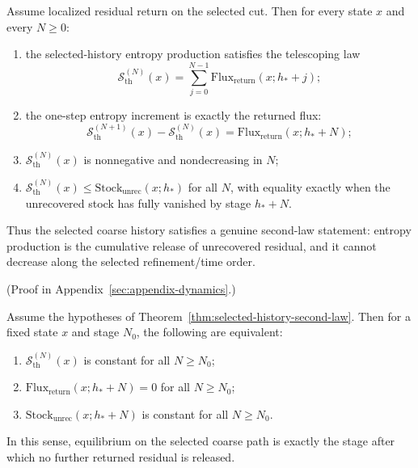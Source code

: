 \begin{theorem}
\label{thm:selected-history-second-law}
Assume localized residual return on the selected cut. Then for every state
\(x\) and every \(N\ge 0\):
\begin{enumerate}[label=(\roman*), leftmargin=2em, itemsep=0.2em]
\item the selected-history entropy production satisfies the telescoping law
      \[
      \mathcal S_{\mathrm{th}}^{(N)}(x)
      =
      \sum_{j=0}^{N-1}\mathrm{Flux}_{\mathrm{return}}(x;h_\ast+j);
      \]
\item the one-step entropy increment is exactly the returned flux:
      \[
      \mathcal S_{\mathrm{th}}^{(N+1)}(x)-\mathcal S_{\mathrm{th}}^{(N)}(x)
      =
      \mathrm{Flux}_{\mathrm{return}}(x;h_\ast+N);
      \]
\item \(\mathcal S_{\mathrm{th}}^{(N)}(x)\) is nonnegative and nondecreasing in
      \(N\);
\item \(\mathcal S_{\mathrm{th}}^{(N)}(x)\le
      \mathrm{Stock}_{\mathrm{unrec}}(x;h_\ast)\) for all \(N\), with equality
      exactly when the unrecovered stock has fully vanished by stage
      \(h_\ast+N\).
\end{enumerate}
Thus the selected coarse history satisfies a genuine second-law statement:
entropy production is the cumulative release of unrecovered residual, and it
cannot decrease along the selected refinement/time order.
\end{theorem}

(Proof in Appendix~\ref{sec:appendix-dynamics}.)

\begin{corollary}
\label{cor:selected-history-equilibrium-criterion}
Assume the hypotheses of
Theorem~\ref{thm:selected-history-second-law}. Then for a fixed state \(x\) and
stage \(N_0\), the following are equivalent:
\begin{enumerate}[label=(\roman*), leftmargin=2em, itemsep=0.2em]
\item \(\mathcal S_{\mathrm{th}}^{(N)}(x)\) is constant for all \(N\ge N_0\);
\item \(\mathrm{Flux}_{\mathrm{return}}(x;h_\ast+N)=0\) for all \(N\ge N_0\);
\item \(\mathrm{Stock}_{\mathrm{unrec}}(x;h_\ast+N)\) is constant for all
      \(N\ge N_0\).
\end{enumerate}
In this sense, equilibrium on the selected coarse path is exactly the stage
after which no further returned residual is released.
\end{corollary}

